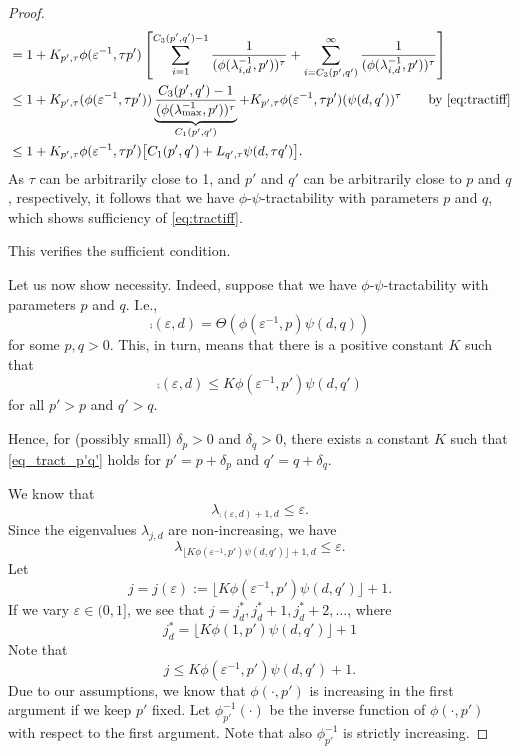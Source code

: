 \documentclass{article}
\theoremstyle{definition}
\begin{document}
\begin{proof}
\begin{align*}
       & = 1 + K_{p',\tau}\phi(\varepsilon^{-1},\tau p') \left [ \sum_{i=1}^{C_3(p',q')-1} \frac{1}{(\phi(\lambda_{i, d}^{-1},p'))^\tau}  + \sum_{i=C_3(p',q')}^\infty \frac{1}{(\phi(\lambda_{i, d}^{-1},p'))^\tau} \right ] \\
       & \le 1+ K_{p',\tau} (\phi(\varepsilon^{-1},\tau p')) \underbrace{\frac{C_3(p',q')-1}{(\phi(\lambda_{\max}^{-1},p'))^\tau}}_{C_1(p',q')}
       +  K_{p',\tau}\phi(\varepsilon^{-1},\tau p') (\psi(d,q'))^\tau 
        \qquad \text{by \eqref{eq:tractiff}} \\
        & \le 1+ K_{p',\tau} \phi(\varepsilon^{-1},\tau p') \bigl[C_1(p',q') + L_{q',\tau}\psi(d,\tau q') \bigr].
\end{align*}
As $\tau$ can be arbitrarily close to 1, and $p'$ and $q'$ can be arbitrarily close to $p$ and $q$, respectively, it follows that we have $\phi$-$\psi$-tractability with parameters $p$ and $q$, which shows sufficiency of \eqref{eq:tractiff}. 

This verifies the sufficient condition.

\bigskip


Let us now show necessity. Indeed, suppose that we have 
$\phi$-$\psi$-tractability with parameters $p$ and $q$. I.e., 
\[
\comp(\varepsilon,d)=\Theta (\phi(\varepsilon^{-1},p)\psi(d,q))
\]
for some $p,q>0$. This, in turn, means that there is a positive constant $K$ such that
\begin{equation}\label{eq_tract_p'q'}
\comp(\varepsilon,d)\le K \phi(\varepsilon^{-1},p')\psi(d,q')
\end{equation}
for all $p'>p$ and $q'>q$. 

Hence, for (possibly small) $\delta_p>0$ and $\delta_q>0$, there exists a constant $K$ such that \eqref{eq_tract_p'q'} holds for $p'=p+\delta_p$ 
and $q'=q+\delta_q$.

We know that
\[
\lambda_{\comp(\varepsilon,d)+1,d}\le \varepsilon.
\]
Since the eigenvalues $\lambda_{j,d}$ are non-increasing, we have
\begin{equation}\label{eq:lambda_K}
\lambda_{\lfloor K \phi(\varepsilon^{-1},p')\psi(d,q')\rfloor +1,d}\le \varepsilon.
\end{equation}
Let
\[
j=j (\varepsilon):= \lfloor K \phi(\varepsilon^{-1},p')\psi(d,q')\rfloor +1.
\]
If we vary $\varepsilon\in (0,1]$, we see that $j=j_d^*, j_d^*+1, j_d^*+2,\ldots$, where 
\[
  j_d^*=\lfloor K \phi(1,p')\psi(d,q')\rfloor +1
\]
Note that
\[
j\le K \phi(\varepsilon^{-1},p')\psi(d,q') +1.
\]
Due to our assumptions, we know that 
$\phi(\cdot, p')$ is increasing in the first argument if 
we keep $p'$ fixed. Let $\phi_{p'}^{-1} (\cdot)$ be the inverse function of $\phi (\cdot, p')$ with respect to the first argument. Note that also $\phi_{p'}^{-1}$ is strictly increasing. 


\end{proof}
\end{document}
